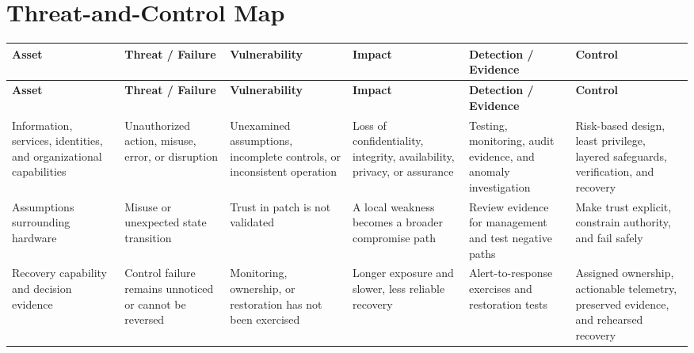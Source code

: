 \documentclass[11pt]{article}
\begin{document}
\section*{Threat-and-Control Map}
\begingroup\scriptsize\setlength{\tabcolsep}{2pt}
\begin{longtable}{>{\RaggedRight\arraybackslash}p{}>{\RaggedRight\arraybackslash}p{}>{\RaggedRight\arraybackslash}p{}>{\RaggedRight\arraybackslash}p{}>{\RaggedRight\arraybackslash}p{}>{\RaggedRight\arraybackslash}p{}}
\toprule\rowcolor{Navy}\color{white}\textbf{Asset} & \color{white}\textbf{Threat / Failure} & \color{white}\textbf{Vulnerability} & \color{white}\textbf{Impact} & \color{white}\textbf{Detection / Evidence} & \color{white}\textbf{Control}\\\midrule
\endfirsthead
\toprule\rowcolor{Navy}\color{white}\textbf{Asset} & \color{white}\textbf{Threat / Failure} & \color{white}\textbf{Vulnerability} & \color{white}\textbf{Impact} & \color{white}\textbf{Detection / Evidence} & \color{white}\textbf{Control}\\\midrule
\endhead
Information, services, identities, and organizational capabilities & Unauthorized action, misuse, error, or disruption & Unexamined assumptions, incomplete controls, or inconsistent operation & Loss of confidentiality, integrity, availability, privacy, or assurance & Testing, monitoring, audit evidence, and anomaly investigation & Risk-based design, least privilege, layered safeguards, verification, and recovery\\\midrule
Assumptions surrounding hardware & Misuse or unexpected state transition & Trust in patch is not validated & A local weakness becomes a broader compromise path & Review evidence for management and test negative paths & Make trust explicit, constrain authority, and fail safely\\\midrule
Recovery capability and decision evidence & Control failure remains unnoticed or cannot be reversed & Monitoring, ownership, or restoration has not been exercised & Longer exposure and slower, less reliable recovery & Alert-to-response exercises and restoration tests & Assigned ownership, actionable telemetry, preserved evidence, and rehearsed recovery\\\midrule
\bottomrule
\end{longtable}
\endgroup
\end{document}
